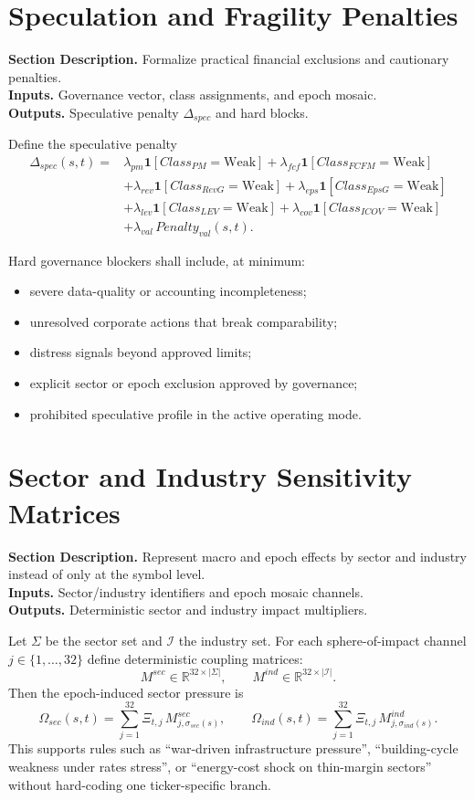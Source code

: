 \documentclass[11pt]{report}
\newcommand{\meta}[3]{\textbf{Section Description.} #1\\
\textbf{Inputs.} #2\\
\textbf{Outputs.} #3\par}
\begin{document}
\section{Speculation and Fragility Penalties}
\meta{Formalize practical financial exclusions and cautionary penalties.}{Governance vector, class assignments, and epoch mosaic.}{Speculative penalty $\Delta_{spec}$ and hard blocks.}

Define the speculative penalty
\begin{align*}
\Delta_{spec}(s,t)=&\lambda_{pm}\mathbf{1}[Class_{PM}=\text{Weak}]
+\lambda_{fcf}\mathbf{1}[Class_{FCFM}=\text{Weak}] \\
&+\lambda_{rev}\mathbf{1}[Class_{RevG}=\text{Weak}]
+\lambda_{eps}\mathbf{1}[Class_{EpsG}=\text{Weak}] \\
&+\lambda_{lev}\mathbf{1}[Class_{LEV}=\text{Weak}]
+\lambda_{cov}\mathbf{1}[Class_{ICOV}=\text{Weak}] \\
&+\lambda_{val}\,Penalty_{val}(s,t).
\end{align*}

Hard governance blockers shall include, at minimum:
\begin{itemize}
\item severe data-quality or accounting incompleteness;
\item unresolved corporate actions that break comparability;
\item distress signals beyond approved limits;
\item explicit sector or epoch exclusion approved by governance;
\item prohibited speculative profile in the active operating mode.
\end{itemize}

\section{Sector and Industry Sensitivity Matrices}
\meta{Represent macro and epoch effects by sector and industry instead of only at the symbol level.}{Sector/industry identifiers and epoch mosaic channels.}{Deterministic sector and industry impact multipliers.}

Let $\Sigma$ be the sector set and $\mathcal{I}$ the industry set. For each sphere-of-impact channel $j\in\{1,\dots,32\}$ define deterministic coupling matrices:
\[
M^{sec}\in\mathbb{R}^{32\times |\Sigma|},\qquad M^{ind}\in\mathbb{R}^{32\times |\mathcal{I}|}.
\]
Then the epoch-induced sector pressure is
\[
\Omega_{sec}(s,t)=\sum_{j=1}^{32}\Xi_{t,j}\,M^{sec}_{j,\sigma_{sec}(s)},
\qquad
\Omega_{ind}(s,t)=\sum_{j=1}^{32}\Xi_{t,j}\,M^{ind}_{j,\sigma_{ind}(s)}.
\]
This supports rules such as ``war-driven infrastructure pressure'', ``building-cycle weakness under rates stress'', or ``energy-cost shock on thin-margin sectors'' without hard-coding one ticker-specific branch.
\end{document}
